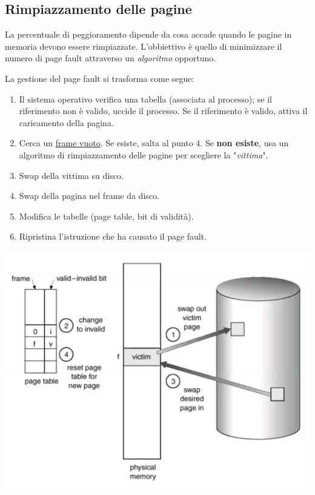 \documentclass[a4paper,12pt, twoside]{report}
\newcommand{\defbox}[1]{\noindent\colorbox{shadecolor}
{\parbox{\dimexpr\textwidth-2\fboxsep\relax}{#1}}}
\begin{document}
\subsection{Rimpiazzamento delle pagine}

La percentuale di peggioramento dipende da cosa accade quando le pagine in memoria devono essere rimpiazzate. L'obbiettivo \`e quello di minimizzare il numero di page fault attraverso un \emph{algoritmo} opportuno. 

La gestione del page fault si trasforma come segue: 
\begin{enumerate}
    \item Il sistema operativo verifica una tabella (associata al processo); se il riferimento non \`e 
        valido, uccide il processo. Se il riferimento \`e valido, attiva il caricamento della pagina.
    \item \defbox{Cerca un \underline{frame vuoto}. Se esiste, salta al punto 4. Se \textbf{non esiste}, usa un 
        algoritmo di rimpiazzamento delle pagine per scegliere la "\emph{vittima}".}
    \item Swap della vittima su disco. 
    \item Swap della pagina nel frame da disco. 
    \item Modifica le tabelle (page table, bit di validit\`a). 
    \item Ripristina l'istruzione che ha causato il page fault. 
\end{enumerate}

\begin{center}
    \includegraphics[scale=0.25]{replacement_scheme}
\end{center}
\end{document}
